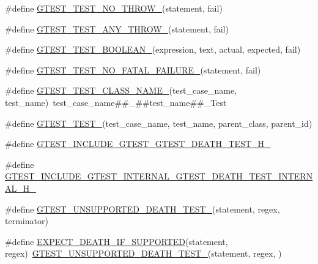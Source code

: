 \begin{DoxyCompactItemize}
\item 
\#define \hyperlink{fused-src_2gtest_2gtest_8h_a9a109d026b5a904646437d7570e13581}{\-G\-T\-E\-S\-T\-\_\-\-T\-E\-S\-T\-\_\-\-N\-O\-\_\-\-T\-H\-R\-O\-W\-\_\-}(statement, fail)
\item 
\#define \hyperlink{fused-src_2gtest_2gtest_8h_af48bbd26d54d4afc5e4cef39b1c76ba3}{\-G\-T\-E\-S\-T\-\_\-\-T\-E\-S\-T\-\_\-\-A\-N\-Y\-\_\-\-T\-H\-R\-O\-W\-\_\-}(statement, fail)
\item 
\#define \hyperlink{fused-src_2gtest_2gtest_8h_ae8912365e1d00a7a2bd248268c64aa1a}{\-G\-T\-E\-S\-T\-\_\-\-T\-E\-S\-T\-\_\-\-B\-O\-O\-L\-E\-A\-N\-\_\-}(expression, text, actual, expected, fail)
\item 
\#define \hyperlink{fused-src_2gtest_2gtest_8h_a1b37a3c446836d33040f3266a6236081}{\-G\-T\-E\-S\-T\-\_\-\-T\-E\-S\-T\-\_\-\-N\-O\-\_\-\-F\-A\-T\-A\-L\-\_\-\-F\-A\-I\-L\-U\-R\-E\-\_\-}(statement, fail)
\item 
\#define \hyperlink{fused-src_2gtest_2gtest_8h_a87a1ee3a3b9b798195236d053f2e5dcc}{\-G\-T\-E\-S\-T\-\_\-\-T\-E\-S\-T\-\_\-\-C\-L\-A\-S\-S\-\_\-\-N\-A\-M\-E\-\_\-}(test\-\_\-case\-\_\-name, test\-\_\-name)~test\-\_\-case\-\_\-name\#\#\-\_\-\#\#test\-\_\-name\#\#\-\_\-\-Test
\item 
\#define \hyperlink{fused-src_2gtest_2gtest_8h_ae2d26f0f92fbaf62bf4c1eca45bb2f1f}{\-G\-T\-E\-S\-T\-\_\-\-T\-E\-S\-T\-\_\-}(test\-\_\-case\-\_\-name, test\-\_\-name, parent\-\_\-class, parent\-\_\-id)
\item 
\#define \hyperlink{fused-src_2gtest_2gtest_8h_a9be22723f67d5ad4d6d26214a84a19f9}{\-G\-T\-E\-S\-T\-\_\-\-I\-N\-C\-L\-U\-D\-E\-\_\-\-G\-T\-E\-S\-T\-\_\-\-G\-T\-E\-S\-T\-\_\-\-D\-E\-A\-T\-H\-\_\-\-T\-E\-S\-T\-\_\-\-H\-\_\-}
\item 
\#define \hyperlink{fused-src_2gtest_2gtest_8h_a83e03f206a1c53a656f7eac87c122d16}{\-G\-T\-E\-S\-T\-\_\-\-I\-N\-C\-L\-U\-D\-E\-\_\-\-G\-T\-E\-S\-T\-\_\-\-I\-N\-T\-E\-R\-N\-A\-L\-\_\-\-G\-T\-E\-S\-T\-\_\-\-D\-E\-A\-T\-H\-\_\-\-T\-E\-S\-T\-\_\-\-I\-N\-T\-E\-R\-N\-A\-L\-\_\-\-H\-\_\-}
\item 
\#define \hyperlink{fused-src_2gtest_2gtest_8h_a29a145cda8bd2d0c6a78b0ac1d670d18}{\-G\-T\-E\-S\-T\-\_\-\-U\-N\-S\-U\-P\-P\-O\-R\-T\-E\-D\-\_\-\-D\-E\-A\-T\-H\-\_\-\-T\-E\-S\-T\-\_\-}(statement, regex, terminator)
\item 
\#define \hyperlink{fused-src_2gtest_2gtest_8h_a8564de0e012dd0898949c513d1571f8b}{\-E\-X\-P\-E\-C\-T\-\_\-\-D\-E\-A\-T\-H\-\_\-\-I\-F\-\_\-\-S\-U\-P\-P\-O\-R\-T\-E\-D}(statement, regex)~\hyperlink{gtest-death-test-internal_8h_a29a145cda8bd2d0c6a78b0ac1d670d18}{\-G\-T\-E\-S\-T\-\_\-\-U\-N\-S\-U\-P\-P\-O\-R\-T\-E\-D\-\_\-\-D\-E\-A\-T\-H\-\_\-\-T\-E\-S\-T\-\_\-}(statement, regex, )

\end{DoxyCompactItemize}
